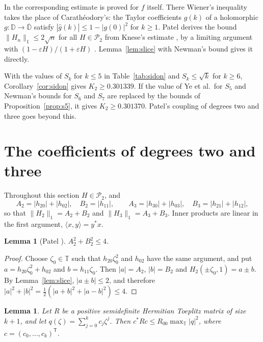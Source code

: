 \documentclass[11pt]{amsart}
\newtheorem{lemma}[theorem]{Lemma}
\theoremstyle{remark}
\numberwithin{equation}{section}
\newcommand{\D}{\mathbb{D}}
\newcommand{\T}{\mathbb{T}}
\newcommand{\Pclass}{\mathcal{P}_2}
\newcommand{\SidonRoot}{0.301339}
\begin{document}
In \cite{BCGMMS21} the corresponding estimate is proved for $f$ itself. There Wiener's inequality takes the place of Carath\'eodory's: the Taylor coefficients $\hat g(k)$ of a holomorphic $g\colon\D\to\overline{\D}$ satisfy $|\hat g(k)|\le1-|g(0)|^2$ for $k\ge1$. Patel derives the bound $\|H_n\|_1\le2\sqrt n$ for all $H\in\Pclass$ from Knese's estimate \cite[Lemma~2.1]{Kne25}, by a limiting argument with $(1-\varepsilon H)/(1+\varepsilon H)$ \cite{PatMDB}. Lemma~\ref{lem:slice} with Newman's bound gives it directly.

With the values of $S_k$ for $k\le5$ in Table~\ref{tab:sidon} and $S_k\le\sqrt k$ for $k\ge6$, Corollary~\ref{cor:sidon} gives $K_2\ge\SidonRoot$. If the value of Ye et al.\ for $S_5$ and Newman's bounds for $S_6$ and $S_7$ are replaced by the bounds of Proposition~\ref{prop:s5}, it gives $K_2\ge0.301370$. Patel's coupling of degrees two and three goes beyond this.

\section{The coefficients of degrees two and three}\label{sec:patel}

Throughout this section $H\in\Pclass$, and
\[
A_2=|h_{20}|+|h_{02}|,\quad B_2=|h_{11}|,\qquad A_3=|h_{30}|+|h_{03}|,\quad B_3=|h_{21}|+|h_{12}|,
\]
so that $\|H_2\|_1=A_2+B_2$ and $\|H_3\|_1=A_3+B_3$. Inner products are linear in the first argument, $\langle x,y\rangle=y^*x$.

\begin{lemma}[Patel {\cite{PatMDB}}]\label{lem:quad}
$A_2^2+B_2^2\le4$.
\end{lemma}

\begin{proof}
Choose $\zeta_0\in\T$ such that $h_{20}\zeta_0^2$ and $h_{02}$ have the same argument, and put $a=h_{20}\zeta_0^2+h_{02}$ and $b=h_{11}\zeta_0$. Then $|a|=A_2$, $|b|=B_2$ and $H_2(\pm\zeta_0,1)=a\pm b$. By Lemma~\ref{lem:slice}, $|a\pm b|\le2$, and therefore $|a|^2+|b|^2=\tfrac12(|a+b|^2+|a-b|^2)\le4$.
\end{proof}

\begin{lemma}\label{lem:toeplitz}
Let $R$ be a positive semidefinite Hermitian Toeplitz matrix of size $k+1$, and let $q(\zeta)=\sum_{j=0}^kc_j\zeta^j$. Then $c^*Rc\le R_{00}\max_\T|q|^2$, where $c=(c_0,\dots,c_k)^{\mathsf T}$.
\end{lemma}
\end{document}
